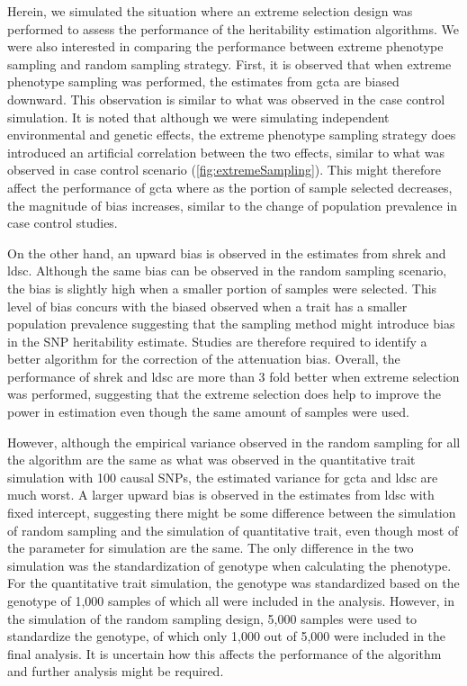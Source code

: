 	Herein, we simulated the situation where an extreme selection design was performed to assess the performance of the heritability estimation algorithms.
	We were also interested in comparing the performance between extreme phenotype sampling and random sampling strategy.
	First, it is observed that when extreme phenotype sampling was performed, the estimates from \gls{gcta} are biased downward. 
	This observation is similar to what was observed in the case control simulation.
	It is noted that although we were simulating independent environmental and genetic effects, the extreme phenotype sampling strategy does introduced an artificial correlation between the two effects, similar to what was observed in case control scenario (\cref{fig:extremeSampling}).
	This might therefore affect the performance of \gls{gcta} where as the portion of sample selected decreases, the magnitude of bias increases, similar to the change of population prevalence in case control studies. 
	
	On the other hand, an upward bias is observed in the estimates from \gls{shrek} and \gls{ldsc}.
	Although the same bias can be observed in the random sampling scenario, the bias is slightly high when a smaller portion of samples were selected.
	This level of bias concurs with the biased observed when a trait has a smaller population prevalence suggesting that the sampling method might introduce bias in the \gls{SNP} heritability estimate.
	Studies are therefore required to identify a better algorithm for the correction of the attenuation bias. 
	Overall, the performance of \gls{shrek} and \gls{ldsc} are more than 3 fold better when extreme selection was performed, suggesting that the extreme selection does help to improve the power in estimation even though the same amount of samples were used.
	
	However, although the empirical variance observed in the random sampling for all the algorithm are the same as what was observed in the quantitative trait simulation with 100 causal \glspl{SNP}, the estimated variance for \gls{gcta} and \gls{ldsc} are much worst.
	A larger upward bias is observed in the estimates from \gls{ldsc} with fixed intercept, suggesting there might be some difference between the simulation of random sampling and the simulation of quantitative trait, even though most of the parameter for simulation are the same.
	The only difference in the two simulation was the standardization of genotype when calculating the phenotype.
	For the quantitative trait simulation, the genotype was standardized based on the genotype of 1,000 samples of which all were included in the analysis. 
	However, in the simulation of the random sampling design, 5,000 samples were used to standardize the genotype, of which only 1,000 out of 5,000 were included in the final analysis.
	It is uncertain how this affects the performance of the algorithm and further analysis might be required.
	
